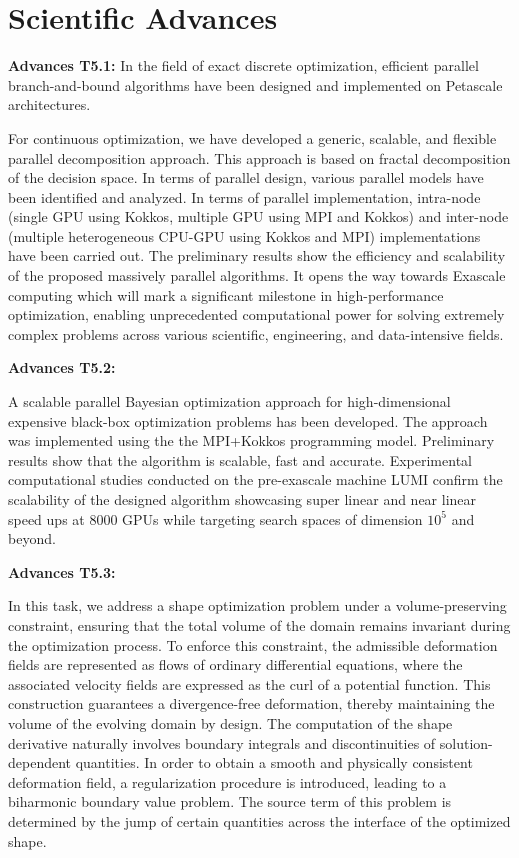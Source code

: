 \section{Scientific Advances}
  
{\bf Advances T5.1:}
In the field of exact discrete optimization, efficient parallel branch-and-bound algorithms have been designed and implemented on Petascale architectures. 

\medskip

For continuous optimization, we have developed a generic, scalable, and flexible parallel decomposition approach. This approach is based on fractal decomposition of the decision space. In terms of parallel design, various parallel models have been identified and analyzed. In terms of parallel implementation, intra-node (single GPU using Kokkos, multiple GPU using MPI and Kokkos) and inter-node (multiple heterogeneous CPU-GPU using Kokkos and MPI) implementations have been carried out. The preliminary results show the efficiency and scalability of the proposed massively parallel algorithms. It opens the way towards Exascale computing which will mark a significant milestone in high-performance optimization, enabling unprecedented computational power for solving extremely complex problems across various scientific, engineering, and data-intensive fields.

\medskip

{\bf Advances T5.2:} 

A scalable parallel Bayesian optimization approach for high-dimensional expensive black-box optimization problems has been developed. The approach was implemented using the the MPI+Kokkos programming model. Preliminary results show that the algorithm is scalable, fast and  accurate. Experimental computational studies conducted on the pre-exascale machine LUMI  confirm the scalability of the designed algorithm showcasing super linear and near linear speed ups at 8000 GPUs while targeting search spaces of dimension $10^5$ and beyond.

\medskip

{\bf Advances T5.3:}

In this task, we address a shape optimization problem under a volume-preserving constraint, ensuring that the total volume of the domain remains invariant during the optimization process. To enforce this constraint, the admissible deformation fields are represented as flows of ordinary differential equations, where the associated velocity fields are expressed as the curl of a potential function. This construction guarantees a divergence-free deformation, thereby maintaining the volume of the evolving domain by design. The computation of the shape derivative naturally involves boundary integrals and discontinuities of solution-dependent quantities. In order to obtain a smooth and physically consistent deformation field, a regularization procedure is introduced, leading to a biharmonic boundary value problem. The source term of this problem is determined by the jump of certain quantities across the interface of the optimized shape.

